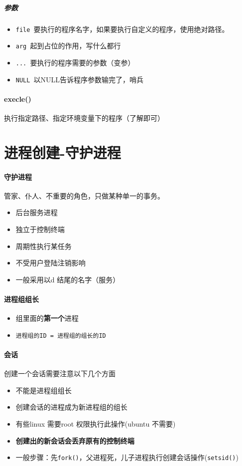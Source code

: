 \documentclass[UTF8,a4paper,12pt]{ctexbook}
\begin{document}
					\subparagraph{参数}
						\begin{itemize}[itemindent = 1em]
							\item \verb|file |要执行的程序名字，如果要执行自定义的程序，使用绝对路径。
							\item \verb|arg |起到占位的作用，写什么都行
							\item \verb|... |要执行的程序需要的参数（变参）
							\item \verb|NULL |以NULL告诉程序参数输完了，哨兵
						\end{itemize}
			
			\paragraph{execle()}执行指定路径、指定环境变量下的程序（了解即可）
		
	\section{进程创建-守护进程}
		\paragraph{守护进程}管家、仆人、不重要的角色，只做某种单一的事务。
			\begin{itemize}[itemindent = 1em]
				\item 后台服务进程
				\item 独立于控制终端
				\item 周期性执行某任务
				\item 不受用户登陆注销影响
				\item 一般采用以d 结尾的名字（服务）
			\end{itemize}
		
		\paragraph{进程组组长}
			\begin{itemize}[itemindent = 1em]
				\item 组里面的\textbf{第一个}进程
				\item \verb|进程组的ID = 进程组的组长的ID|
			\end{itemize}
			
		\paragraph{会话}创建一个会话需要注意以下几个方面
			\begin{itemize}[itemindent = 1em]
				\item 不能是进程组组长
				\item 创建会话的进程成为新进程组的组长
				\item 有些linux 需要root 权限执行此操作(ubuntu 不需要)
				\item \textbf{创建出的新会话会丢弃原有的控制终端}
				\item 一般步骤：先\verb|fork()|，父进程死，儿子进程执行创建会话操作(\verb|setsid()|)
			\end{itemize}
		
\end{document}
